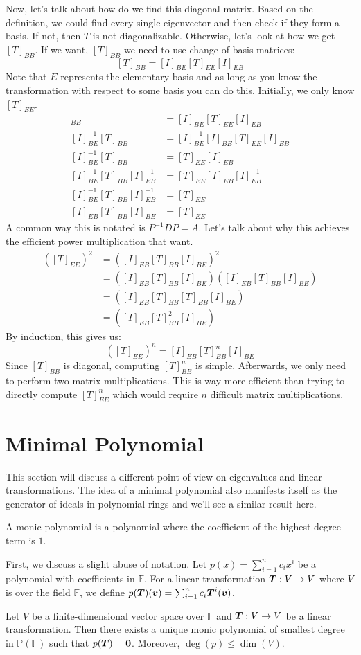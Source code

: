 Now, let's talk about how do we find this diagonal matrix. Based on the definition, we could find every single eigenvector and then check if they form a basis. If not, then $T$ is not diagonalizable. Otherwise, let's look at how we get $[T]_{BB}$. If we want, $[T]_{BB}$ we need to use change of basis matrices:
$$[T]_{BB}=[I]_{BE}[T]_{EE}[I]_{EB}$$
Note that $E$ represents the elementary basis and as long as you know the transformation with respect to some basis you can do this. Initially, we only know $[T]_{EE}$.
\begin{align*}
    [T]_{BB}&=[I]_{BE}[T]_{EE}[I]_{EB}\\
    [I]_{BE}^{-1}[T]_{BB}&=[I]_{BE}^{-1}[I]_{BE}[T]_{EE}[I]_{EB}\\
    [I]_{BE}^{-1}[T]_{BB}&=[T]_{EE}[I]_{EB}\\
    [I]_{BE}^{-1}[T]_{BB}[I]_{EB}^{-1}&=[T]_{EE}[I]_{EB}[I]_{EB}^{-1}\\
    [I]_{BE}^{-1}[T]_{BB}[I]_{EB}^{-1}&=[T]_{EE}\\
    [I]_{EB}[T]_{BB}[I]_{BE}&=[T]_{EE}
\end{align*}
A common way this is notated is $P^{-1}DP=A$. Let's talk about why this achieves the efficient power multiplication that want.
\begin{align*}
    ([T]_{EE})^2&=([I]_{EB}[T]_{BB}[I]_{BE})^2\\
    &=([I]_{EB}[T]_{BB}[I]_{BE})([I]_{EB}[T]_{BB}[I]_{BE})\\
    &=([I]_{EB}[T]_{BB}[T]_{BB}[I]_{BE})\\
    &=([I]_{EB}[T]_{BB}^2[I]_{BE})
\end{align*}
By induction, this gives us:
$$([T]_{EE})^n=[I]_{EB}[T]_{BB}^n[I]_{BE}$$
Since $[T]_{BB}$ is diagonal, computing $[T]_{BB}^n$ is simple. Afterwards, we only need to perform two matrix multiplications. This is way more efficient than trying to directly compute $[T]_{EE}^n$ which would require $n$ difficult matrix multiplications.

\section{Minimal Polynomial}
This section will discuss a different point of view on eigenvalues and linear transformations. The idea of a minimal polynomial also manifests itself as the generator of ideals in polynomial rings and we'll see a similar result here.
\begin{definition}
    A monic polynomial is a polynomial where the coefficient of the highest degree term is $1$.
\end{definition}
First, we discuss a slight abuse of notation. Let $p(x)=\sum_{i=1}^nc_ix^i$ be a polynomial with coefficients in $\mathbb{F}$. For a linear transformation $\boldsymbol{T}:V\to V$ where $V$ is over the field $\mathbb{F}$, we define $p(\boldsymbol{T})(\boldsymbol{v})=\sum_{i=1}^nc_i\boldsymbol{T}^i(\boldsymbol{v})$.
\begin{theorem}
    Let $V$ be a finite-dimensional vector space over $\mathbb{F}$ and $\boldsymbol{T}:V\to V$ be a linear transformation. Then there exists a unique monic polynomial of smallest degree in $\mathbb{P}(\mathbb{F})$ such that $p(\boldsymbol{T})=\boldsymbol{0}$. Moreover, $\deg(p)\leq\dim(V)$.
\end{theorem}

